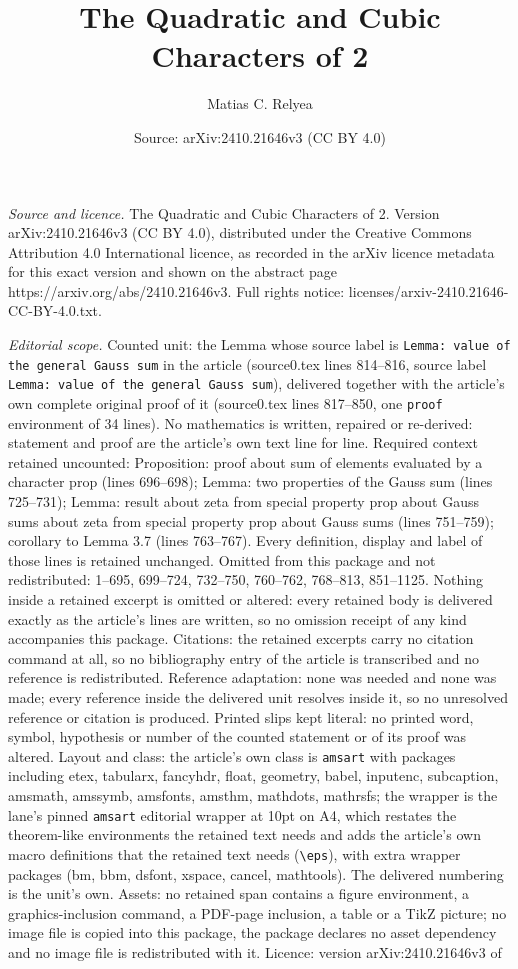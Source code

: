 \documentclass[10pt,a4paper]{amsart}
\title[The Quadratic and Cubic Characters of 2]{The Quadratic and Cubic Characters of 2}
\author{Matias C. Relyea}
\date{Source: arXiv:2410.21646v3 (CC BY 4.0)}
\begin{document}
\maketitle

\noindent\emph{Source and licence.} The Quadratic and Cubic Characters of 2. Version arXiv:2410.21646v3 (CC BY 4.0), distributed under the Creative Commons Attribution 4.0 International licence, as recorded in the arXiv licence metadata for this exact version and shown on the abstract page https://arxiv.org/abs/2410.21646v3. Full rights notice: licenses/arxiv-2410.21646-CC-BY-4.0.txt.\par\smallskip

\noindent\textit{Editorial scope.} Counted unit: the Lemma whose source label is \texttt{Lemma: value of the general Gauss sum} in the article (source0.tex lines 814--816, source label \texttt{Lemma: value of the general Gauss sum}), delivered together with the article's own complete original proof of it (source0.tex lines 817--850, one \texttt{proof} environment of 34 lines). No mathematics is written, repaired or re-derived: statement and proof are the article's own text line for line. Required context retained uncounted: Proposition: proof about sum of elements evaluated by a character prop (lines 696--698); Lemma: two properties of the Gauss sum (lines 725--731); Lemma: result about zeta from special property prop about Gauss sums about zeta from special property prop about Gauss sums (lines 751--759); corollary to Lemma 3.7 (lines 763--767). Every definition, display and label of those lines is retained unchanged. Omitted from this package and not redistributed: 1--695, 699--724, 732--750, 760--762, 768--813, 851--1125. Nothing inside a retained excerpt is omitted or altered: every retained body is delivered exactly as the article's lines are written, so no omission receipt of any kind accompanies this package. Citations: the retained excerpts carry no citation command at all, so no bibliography entry of the article is transcribed and no reference is redistributed. Reference adaptation: none was needed and none was made; every reference inside the delivered unit resolves inside it, so no unresolved reference or citation is produced. Printed slips kept literal: no printed word, symbol, hypothesis or number of the counted statement or of its proof was altered. Layout and class: the article's own class is \texttt{amsart} with packages including etex, tabularx, fancyhdr, float, geometry, babel, inputenc, subcaption, amsmath, amssymb, amsfonts, amsthm, mathdots, mathrsfs; the wrapper is the lane's pinned \texttt{amsart} editorial wrapper at 10pt on A4, which restates the theorem-like environments the retained text needs and adds the article's own macro definitions that the retained text needs (\texttt{\textbackslash eps}), with extra wrapper packages (bm, bbm, dsfont, xspace, cancel, mathtools). The delivered numbering is the unit's own. Assets: no retained span contains a figure environment, a graphics-inclusion command, a PDF-page inclusion, a table or a TikZ picture; no image file is copied into this package, the package declares no asset dependency and no image file is redistributed with it. Licence: version arXiv:2410.21646v3 of 
\end{document}
